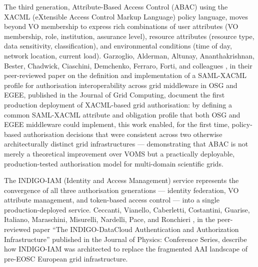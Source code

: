 \documentclass[12pt,a4paper]{report}
\begin{document}
      The third generation, Attribute-Based Access Control (ABAC) using the XACML 
      (eXtensible Access Control Markup Language) policy language, moves beyond VO membership to express rich combinations of user attributes 
      (VO membership, role, institution, assurance level), resource attributes (resource type, data sensitivity, classification), and environmental
       conditions (time of day, network location, current load). Garzoglio, Alderman, Altunay, Ananthakrishnan, Bester, Chadwick, Ciaschini, 
       Demchenko, Ferraro, Forti, and colleagues \parencite{garzoglio2009interoperability}, in their peer-reviewed paper on the definition and implementation of a SAML-XACML profile 
       for authorisation interoperability across grid middleware in OSG and EGEE, published in the Journal of Grid Computing, document the first 
       production deployment of XACML-based grid authorisation: by defining a common SAML-XACML attribute and obligation profile that both OSG and
        EGEE middleware could implement, this work enabled, for the first time, policy-based authorisation decisions that were consistent across 
        two otherwise architecturally distinct grid infrastructures — demonstrating that ABAC is not merely a theoretical improvement over VOMS but 
        a practically deployable, production-tested authorisation model for multi-domain scientific grids.

The INDIGO-IAM (Identity and Access Management) service represents the convergence of all three authorisation generations — identity federation, 
VO attribute management, and token-based access control — into a single production-deployed service. Ceccanti, Vianello, Caberletti, Costantini, 
Guarise, Italiano, Maraschini, Misurelli, Nardelli, Pace, and Ronchieri \parencite{ceccanti2017indigo}, in the peer-reviewed paper “The INDIGO-DataCloud Authentication 
and Authorization Infrastructure” published in the Journal of Physics: Conference Series, describe how INDIGO-IAM was architected to replace the 
fragmented AAI landscape of pre-EOSC European grid infrastructure. 
\end{document}
